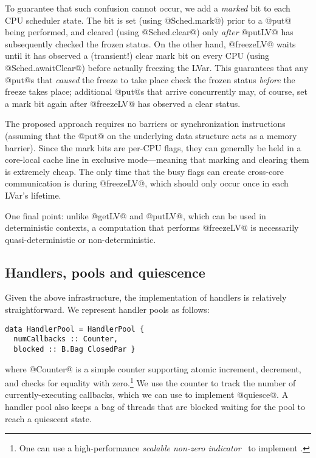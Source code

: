 To guarantee that such confusion cannot occur, we add a \emph{marked}
bit to each CPU scheduler state.  The bit is set (using @Sched.mark@)
prior to a @put@ being performed, and cleared (using @Sched.clear@)
only \emph{after} @putLV@ has subsequently checked the frozen status.
On the other hand, @freezeLV@ waits until it has observed a
(transient!) clear mark bit on every CPU (using @Sched.awaitClear@)
before actually freezing the LVar.  This guarantees that any @put@s
that \emph{caused} the freeze to take place check the frozen status
\emph{before} the freeze takes place; additional @put@s that arrive
concurrently may, of course, set a mark bit again after @freezeLV@ has
observed a clear status.

The proposed approach requires no barriers or synchronization
instructions (assuming that the @put@ on the underlying data structure
acts as a memory barrier).  Since the mark bits are per-CPU flags,
they can generally be held in a core-local cache line in exclusive
mode---meaning that marking and clearing them is extremely cheap.  The
only time that the busy flags can create cross-core communication is
during @freezeLV@, which should only occur once in each LVar's lifetime.

One final point: unlike @getLV@ and @putLV@, which can be used in deterministic
contexts, a computation that performs @freezeLV@ is necessarily
quasi-deterministic or non-deterministic.

\subsection{Handlers, pools and quiescence}

Given the above infrastructure, the implementation of handlers is
relatively straightforward.  We represent handler pools as follows:

\singlespacing
\begin{lstlisting}
data HandlerPool = HandlerPool {
  numCallbacks :: Counter,  
  blocked :: B.Bag ClosedPar }
\end{lstlisting}
\doublespacing
%
where @Counter@ is a simple counter supporting atomic increment,
decrement, and checks for equality with zero.\footnote{One can use a
  high-performance \emph{scalable non-zero indicator}~\cite{snzi} to
  implement .
}  We use the
counter to track the number of currently-executing callbacks, which we
can use to implement @quiesce@.  A handler pool also keeps a bag of
threads that are blocked waiting for the pool to reach a quiescent
state.

